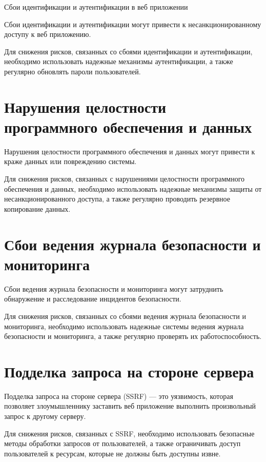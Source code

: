 Сбои идентификации и аутентификации в веб приложении

Сбои идентификации и аутентификации могут привести к несанкционированному доступу к веб приложению.

Для снижения рисков, связанных со сбоями идентификации и аутентификации, необходимо использовать надежные механизмы аутентификации, а также регулярно обновлять пароли пользователей.

\vspace{20pt}
{\let\clearpage\relax \chapter{Нарушения целостности программного обеспечения и данных}}

Нарушения целостности программного обеспечения и данных могут привести к краже данных или повреждению системы.

Для снижения рисков, связанных с нарушениями целостности программного обеспечения и данных, необходимо использовать надежные механизмы защиты от несанкционированного доступа, а также регулярно проводить резервное копирование данных.


\vspace{20pt}
{\let\clearpage\relax \chapter{Сбои ведения журнала безопасности и мониторинга}}

Сбои ведения журнала безопасности и мониторинга могут затруднить обнаружение и расследование инцидентов безопасности.

Для снижения рисков, связанных со сбоями ведения журнала безопасности и мониторинга, необходимо использовать надежные системы ведения журнала безопасности и мониторинга, а также регулярно проверять их работоспособность.


\vspace{20pt}
{\let\clearpage\relax \chapter{Подделка запроса на стороне сервера}}


Подделка запроса на стороне сервера (SSRF) — это уязвимость, которая позволяет злоумышленнику заставить веб приложение выполнить произвольный запрос к другому серверу.

Для снижения рисков, связанных с SSRF, необходимо использовать безопасные методы обработки запросов от пользователей, а также ограничивать доступ пользователей к ресурсам, которые не должны быть доступны извне.

